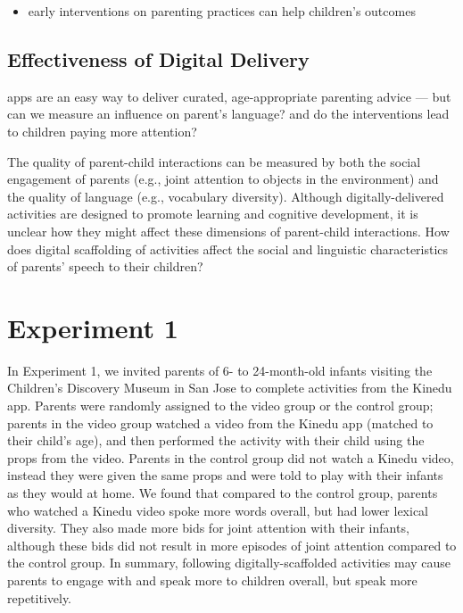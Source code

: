 \documentclass[10pt, letterpaper]{article}
\begin{document}
\begin{itemize}
\tightlist
\item
  early interventions on parenting practices can help children's
  outcomes
\end{itemize}

\subsection{Effectiveness of Digital
Delivery}\label{effectiveness-of-digital-delivery}

apps are an easy way to deliver curated, age-appropriate parenting
advice --- but can we measure an influence on parent's language? and do
the interventions lead to children paying more attention?

The quality of parent-child interactions can be measured by both the
social engagement of parents (e.g., joint attention to objects in the
environment) and the quality of language (e.g., vocabulary diversity).
Although digitally-delivered activities are designed to promote learning
and cognitive development, it is unclear how they might affect these
dimensions of parent-child interactions. How does digital scaffolding of
activities affect the social and linguistic characteristics of parents'
speech to their children?

\section{Experiment 1}\label{experiment-1}

In Experiment 1, we invited parents of 6- to 24-month-old infants
visiting the Children's Discovery Museum in San Jose to complete
activities from the Kinedu app. Parents were randomly assigned to the
video group or the control group; parents in the video group watched a
video from the Kinedu app (matched to their child's age), and then
performed the activity with their child using the props from the video.
Parents in the control group did not watch a Kinedu video, instead they
were given the same props and were told to play with their infants as
they would at home. We found that compared to the control group, parents
who watched a Kinedu video spoke more words overall, but had lower
lexical diversity. They also made more bids for joint attention with
their infants, although these bids did not result in more episodes of
joint attention compared to the control group. In summary, following
digitally-scaffolded activities may cause parents to engage with and
speak more to children overall, but speak more repetitively.
\end{document}
